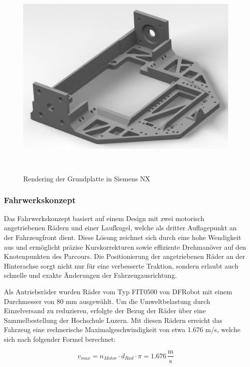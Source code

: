 \documentclass[main.tex]{subfiles} %
\begin{document}
\begin{figure}[H]
    \centering
    \includegraphics[width = 0.9\linewidth]{./fig_Mechanik/Rendering_Grundplatte.pdf}
    \caption{Rendering der Grundplatte in Siemens NX}~\label{Chassis-Grundplatte}
\end{figure}

\newpage

\subsubsection*{Fahrwerkskonzept}

Das Fahrwerkskonzept basiert auf einem Design mit zwei motorisch angetriebenen Rädern 
und einer Laufkugel, welche als dritter Auflagepunkt an der Fahrzeugfront dient. 
Diese Lösung zeichnet sich durch eine hohe Wendigkeit aus und ermöglicht präzise 
Kurskorrekturen sowie effiziente Drehmanöver auf den Knotenpunkten des Parcours. 
Die Positionierung der angetriebenen Räder an der Hinterachse sorgt nicht nur für eine 
verbesserte Traktion, sondern erlaubt auch schnelle und exakte Änderungen der 
Fahrzeugausrichtung.

Als Antriebsräder wurden Räder vom Typ FIT0500 von DFRobot mit einem Durchmesser von 
80 mm ausgewählt. Um die Umweltbelastung durch Einzelversand zu reduzieren, erfolgte 
der Bezug der Räder über eine Sammelbestellung der Hochschule Luzern. Mit diesen Rädern 
erreicht das Fahrzeug eine rechnerische Maximalgeschwindigkeit von etwa 1.676 m/s, 
welche sich nach folgender Formel berechnet:

\[ v_{max} = n_{Motor} \cdot d_{Rad} \cdot \pi = 1.676 \, \frac{\text{m}}{\text{s}} \]
\end{document}
